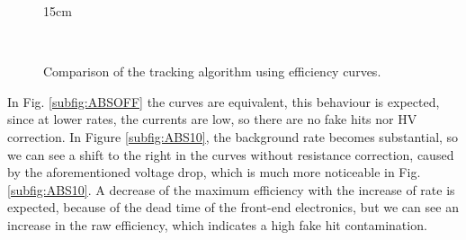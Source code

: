 \begin{figure}[!htm]{15cm}
  \caption{Comparison of the tracking algorithm using efficiency curves.} 
  \label{fig:effcomparison}
  \hfill
    \hfill
  \\
\end{figure}

In Fig. \ref{subfig:ABSOFF} the curves are equivalent, this behaviour is expected, since at lower rates, the currents are low, so there are no fake hits nor HV correction. In Figure \ref{subfig:ABS10}, the background rate becomes substantial, so we can see a shift to the right in the curves without resistance correction, caused by the aforementioned voltage drop, which is much more noticeable in Fig. \ref{subfig:ABS10}. A decrease of the maximum efficiency with the increase of rate is expected, because of the dead time of the front-end electronics, but we can see an increase in the raw efficiency, which indicates a high fake hit contamination.

